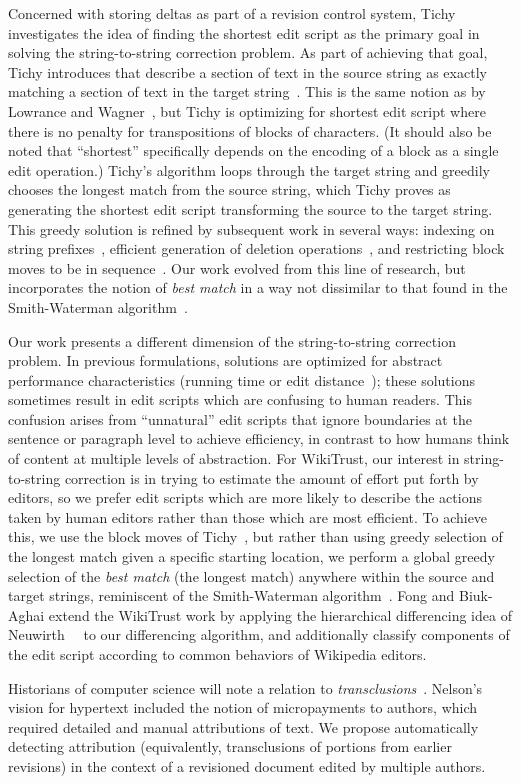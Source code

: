 Concerned with storing deltas as part of a revision control system,
Tichy investigates the idea of finding the shortest edit script as
the primary goal in solving the string-to-string correction problem.
As part of achieving that goal, Tichy introduces 
that describe a section of text in the source string as exactly matching
a section of text in the target string~\cite{Tichy1984}.
This is the same notion as  by
Lowrance and Wagner~\cite{Lowrance1975}, but Tichy is optimizing
for shortest edit script where there is no penalty for transpositions
of blocks of characters.
(It should also be noted that ``shortest'' specifically depends on
the encoding of a block as a single edit operation.)
Tichy's algorithm loops through the target string and greedily chooses
the longest match from the source string, which Tichy proves as
generating the shortest edit script transforming the source to the
target string.
This greedy solution is refined by subsequent work in several ways:
indexing on string prefixes~\cite{Obst1987},
efficient generation of deletion operations~\cite{Reichenberger1991},
and restricting block moves to be in sequence~\cite{Burns1997}.
Our work evolved from this line of research, but
incorporates the notion of \textit{best match}
in a way not dissimilar to that found in the Smith-Waterman
algorithm~\cite{Smith1981}.

Our work presents a different
dimension of the string-to-string correction problem.
In previous formulations, solutions are optimized for abstract
performance characteristics (\eg running time or
edit distance~\cite{Damerau1964,Levenshtein1966}); these solutions sometimes
result in edit scripts which are confusing to human readers.
This confusion arises from ``unnatural'' edit scripts that ignore boundaries
at the sentence or paragraph level to achieve efficiency, in contrast to
how humans think of content at multiple levels of abstraction.
For WikiTrust, our interest in string-to-string correction is in trying
to estimate the amount of effort put forth by editors, so we prefer edit
scripts which are more likely to describe the actions taken by human
editors rather than those which are most efficient.
To achieve this, we use the block moves of Tichy~\cite{Tichy1984}, but rather
than using greedy selection of the longest match given a specific
starting location, we perform a global greedy selection of the
\textit{best match} (\eg the longest match) anywhere within the
source and target strings, reminiscent of the Smith-Waterman
algorithm~\cite{Smith1981}.
Fong and Biuk-Aghai extend the WikiTrust work by applying
the hierarchical differencing idea of
Neuwirth~\etal~\cite{Neuwirth1992} to our differencing algorithm,
and additionally classify components
of the edit script according to common behaviors of Wikipedia editors.

Historians of computer science will note a relation
to \textit{transclusions}~\cite{Nelson81}.
Nelson's vision for hypertext included the notion
of micropayments to authors, which required detailed
and manual attributions of text.
We propose automatically detecting attribution
(equivalently, transclusions of portions from earlier revisions)
in the context of a revisioned document edited
by multiple authors.



